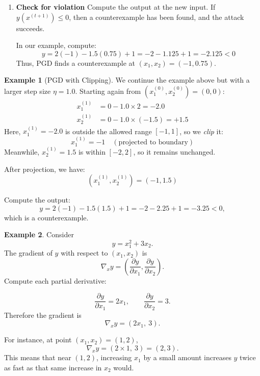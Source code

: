 \documentclass[oneside,11pt,dvipsnames]{book}
\numberwithin{equation}{section}
\theoremstyle{definition}
\newtheorem{example}{Example}[section]
\theoremstyle{remark}
\begin{document}
\begin{enumerate}
\begin{enumerate}
        Our candidate input $(-1.0, +0.75)$ is already within the valid ranges, so no clipping is needed.

        \item \textbf{Check for violation}
        Compute the output at the new input.
        If $y(x^{(t+1)}) \le 0$, then a counterexample has been found, and the attack succeeds.

        In our example, compute:
        \[
        y = 2(-1) - 1.5(0.75) + 1 = -2 - 1.125 + 1 = -2.125 <   0
        \]
        Thus, PGD finds a counterexample at $(x_1, x_2) = (-1, 0.75)$.

    \end{enumerate}
\end{enumerate}


\begin{example}[PGD with Clipping]
We continue the example above but with a larger step size $\eta = 1.0$. Starting again from $(x_1^{(0)}, x_2^{(0)}) = (0, 0)$:
\[
\begin{aligned}
x_1^{(1)} &= 0 - 1.0 \times 2 = -2.0 \\
x_2^{(1)} &= 0 - 1.0 \times (-1.5) = +1.5
\end{aligned}
\]
Here, $x_1^{(1)} = -2.0$ is outside the allowed range $[-1, 1]$, so we \emph{clip} it:
\[
x_1^{(1)} = -1 \quad (\text{projected to boundary})
\]
Meanwhile, $x_2^{(1)} = 1.5$ is within $[-2, 2]$, so it remains unchanged.

After projection, we have:
\[
(x_1^{(1)}, x_2^{(1)}) = (-1, 1.5)
\]

Compute the output:
\[
y = 2(-1) - 1.5(1.5) + 1 = -2 - 2.25 + 1 = -3.25 < 0,
\]
which is a counterexample.

\end{example}


\begin{example}
Consider
\[
y = x_1^2 + 3x_2.
\]
The gradient of $y$ with respect to $(x_1, x_2)$ is
\[
\nabla_x y = \left( \frac{\partial y}{\partial x_1}, \frac{\partial y}{\partial x_2} \right).
\]
Compute each partial derivative:

\[
\frac{\partial y}{\partial x_1} = 2x_1, \qquad
\frac{\partial y}{\partial x_2} = 3.
\]
Therefore the gradient is
\[
\nabla_x y = (2x_1,\ 3).
\]

For instance, at point $(x_1, x_2) = (1, 2)$,
\[
\nabla_x y = (2 \times 1,\ 3) = (2, 3).
\]
This means that near $(1,2)$, increasing $x_1$ by a small amount increases $y$ twice as fast as that same increase in $x_2$ would.
\end{example}
\end{document}

